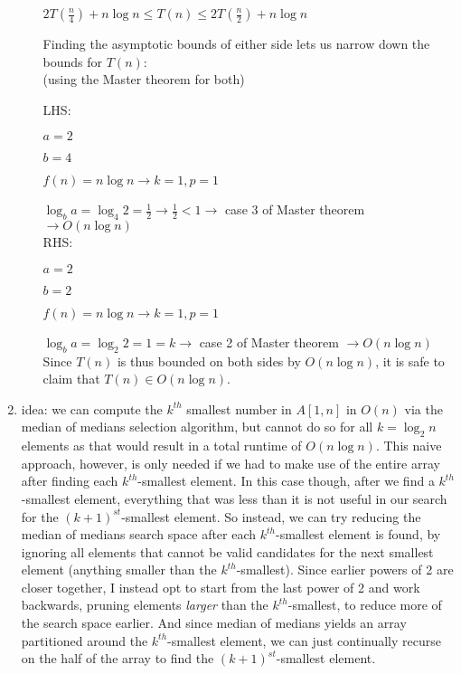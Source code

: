 \documentclass[12pt]{article}
\begin{document}
\begin{enumerate}
\begin{enumerate}
        \centerline{$2T(\frac{n}{4}) + n\log n \leq T(n) \leq 2T(\frac{n}{2}) + n\log n$}

        Finding the asymptotic bounds of either side lets us narrow down the bounds for $T(n)$:\\

        (using the Master theorem for both)

        LHS:

        $a = 2$

        $b = 4$

        $f(n) = n\log n \longrightarrow k = 1, p = 1$

        $\log_{b}{a} = \log_{4}{2} = \frac{1}{2} \longrightarrow \frac{1}{2} < 1 \longrightarrow$ case 3 of Master theorem
        $\longrightarrow O(n\log n)$\\

        RHS:

        $a = 2$

        $b = 2$

        $f(n) = n\log n \longrightarrow k = 1, p = 1$

        $\log_{b}{a} = \log_{2}{2} = 1 = k \longrightarrow$ case 2 of Master theorem 
        $\longrightarrow O(n\log n)$\\

        Since $T(n)$ is thus bounded on both sides by $O(n\log n)$, it is safe to claim that $T(n) \in O(n\log n)$.

    \end{enumerate}
    \item idea: we can compute the $k^{th}$ smallest number in $A[1, n]$ in $O(n)$ via the median of medians selection 
    algorithm, but cannot do so for all $k = \log_2n$ elements as that would result in a total runtime of $O(n\log n)$. 
    This naive approach, however, is only needed if we had to make use of the entire array after finding each $k^{th}$-smallest 
    element. In this case though, after we find a $k^{th}$-smallest element, everything that was less than it is not useful 
    in our search for the $(k+1)^{st}$-smallest element. So instead, we can try reducing the median of medians search space 
    after each $k^{th}$-smallest element is found, by ignoring all elements that cannot be valid candidates for the next smallest element
    (anything smaller than the $k^{th}$-smallest). Since earlier powers of 2 are closer together, I instead opt to start from the last power of 2 and work backwards, pruning 
    elements \textit{larger} than the $k^{th}$-smallest, to reduce more of the search space earlier. And since median of medians 
    yields an array partitioned around the $k^{th}$-smallest element, we can just continually recurse on the half of the array to 
    find the $(k+1)^{st}$-smallest element. 


\end{enumerate}
\end{document}
